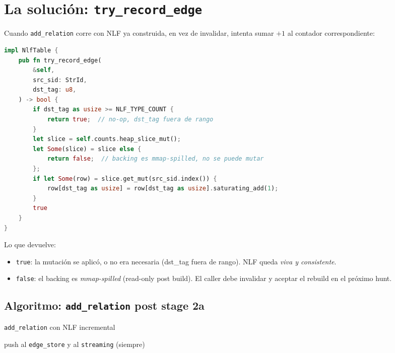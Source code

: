 \section{La solución: \texttt{try\_record\_edge}}

Cuando \texttt{add\_relation} corre con NLF ya construida, en vez
de invalidar, intenta sumar \(+1\) al contador correspondiente:

\begin{lstlisting}[language=Rust]
impl NlfTable {
    pub fn try_record_edge(
        &self,
        src_sid: StrId,
        dst_tag: u8,
    ) -> bool {
        if dst_tag as usize >= NLF_TYPE_COUNT {
            return true;  // no-op, dst_tag fuera de rango
        }
        let slice = self.counts.heap_slice_mut();
        let Some(slice) = slice else {
            return false;  // backing es mmap-spilled, no se puede mutar
        };
        if let Some(row) = slice.get_mut(src_sid.index()) {
            row[dst_tag as usize] = row[dst_tag as usize].saturating_add(1);
        }
        true
    }
}
\end{lstlisting}

Lo que devuelve:

\begin{itemize}
    \item \texttt{true}: la mutación se aplicó, o no era necesaria
    (dst\_tag fuera de rango). NLF queda \emph{viva y consistente}.
    \item \texttt{false}: el backing es \emph{mmap-spilled}
    (read-only post build). El caller debe invalidar y aceptar el
    rebuild en el próximo hunt.
\end{itemize}

\subsection{Algoritmo: \texttt{add\_relation} post stage 2a}

\begin{algorithm}[H]
\caption{\texttt{add\_relation} con NLF incremental}
push al \texttt{edge\_store} y al \texttt{streaming} (siempre)\;
\BlankLine
{}
\end{algorithm}

